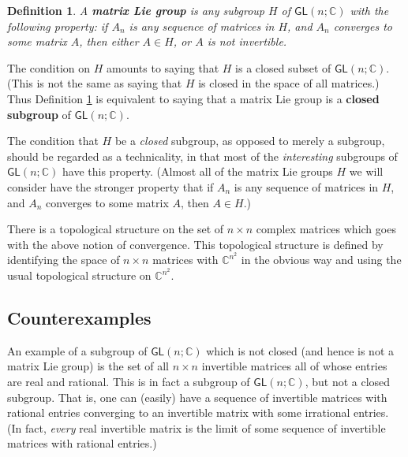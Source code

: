 \documentclass[12pt]{amsbook}
\theoremstyle{plain}
\newtheorem{definition}[theorem]{Definition}
\numberwithin{equation}{chapter}
\numberwithin{theorem}{chapter}
\begin{document}
\begin{definition}
\label{matrix.group}A \textbf{matrix Lie group} is any subgroup $H$ of
$\mathsf{GL}(n;\mathbb{C})$ with the following property: if $A_{n}$ is any
sequence of matrices in $H$, and $A_{n}$ converges to some matrix $A$, then
either $A\in H$, or $A$ is not invertible.
\end{definition}

The condition on $H$ amounts to saying that $H$ is a closed subset of
$\mathsf{GL}(n;\mathbb{C})$. (This is not the same as saying that $H$ is
closed in the space of all matrices.) Thus Definition \ref{matrix.group} is
equivalent to saying that a matrix Lie group is a \textbf{closed subgroup} of
$\mathsf{GL}(n;\mathbb{C})$.

The condition that $H$ be a \textit{closed} subgroup, as opposed to merely a
subgroup, should be regarded as a technicality, in that most of the
\textit{interesting} subgroups of $\mathsf{GL}(n;\mathbb{C})$ have this
property. (Almost all of the matrix Lie groups $H$ we will consider have the
stronger property that if $A_{n}$ is any sequence of matrices in $H$, and
$A_{n}$ converges to some matrix $A$, then $A\in H$.)

There is a topological structure on the set of $n\times n$ complex matrices
which goes with the above notion of convergence. This topological structure is
defined by identifying the space of $n\times n$ matrices with $\mathbb{C}%
^{n^{2}}$ in the obvious way and using the usual topological structure on
$\mathbb{C}^{n^{2}}$.

\subsection{Counterexamples}

An example of a subgroup of $\mathsf{GL}(n;\mathbb{C})$ which is not closed
(and hence is not a matrix Lie group) is the set of all $n\times n$ invertible
matrices all of whose entries are real and rational. This is in fact a
subgroup of $\mathsf{GL}(n;\mathbb{C})$, but not a closed subgroup. That is,
one can (easily) have a sequence of invertible matrices with rational entries
converging to an invertible matrix with some irrational entries. (In fact,
\textit{every} real invertible matrix is the limit of some sequence of
invertible matrices with rational entries.)
\end{document}
